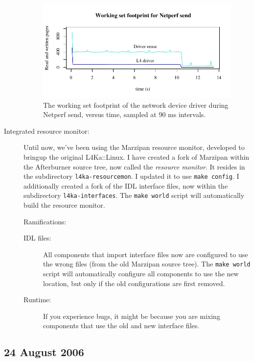 \documentclass[10pt,a4paper]{article}
\newcommand{\cmd}[1]{\texttt{#1}}
\newcommand{\dir}[1]{\texttt{#1}}
\begin{document}
\begin{description}
\begin{figure}[tb]
  \centering
  \includegraphics{figures/ws_netperf_send.pdf}
  \caption[Time plot of working set footprint for Netperf send.]{The
    working set footprint of the network device driver during Netperf send, 
    versus time, sampled at 90 ms intervals.}
  \label{fig:working_set}
\end{figure}

\item[Integrated resource monitor:] Until now, we've been using the Marzipan
resource monitor, developed to bringup the original L4Ka::Linux.  I have
created a fork of Marzipan within the Afterburner source tree, now called the
\emph{resource monitor}.  It resides in the subdirectory
\dir{l4ka-resourcemon}.  I updated it to use \cmd{make config}.  I
additionally created a fork of the IDL interface files, now within the
subdirectory \dir{l4ka-interfaces}.  The \cmd{make world} script
will automatically build the resource monitor.

Ramifications: \begin{description}
\item[IDL files:] All components
that import interface files now are configured to use the wrong files
(from the old Marzipan source tree).  The \cmd{make world} script
will automatically configure all components to use the new location,
but only if the old configurations are first removed.
\item[Runtime:]
If you experience bugs, it might be because you are mixing components
that use the old and new interface files.
\end{description}

\end{description}

\subsection*{24 August 2006}
\end{document}
